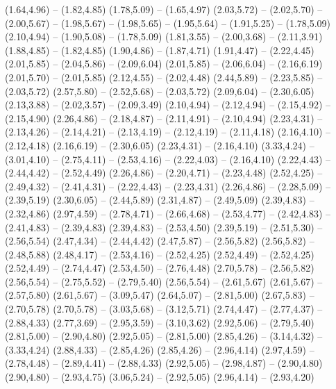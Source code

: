\providecommand\Strasse[1]{\csname geo:Strasse:#1\endcsname}
\def\StrasseListe{haupt,neben}
\expandafter\def\csname geo:Strasse:haupt\endcsname{
  (1.64,4.96) -- (1.82,4.85)
  (1.78,5.09) -- (1.65,4.97)
  (2.03,5.72) -- (2.02,5.70) -- (2.00,5.67) -- (1.98,5.67) -- (1.98,5.65) -- (1.95,5.64) -- (1.91,5.25) -- (1.78,5.09)
  (2.10,4.94) -- (1.90,5.08) -- (1.78,5.09)
  (1.81,3.55) -- (2.00,3.68) -- (2.11,3.91)
  (1.88,4.85) -- (1.82,4.85)
  (1.90,4.86) -- (1.87,4.71)
  (1.91,4.47) -- (2.22,4.45)
  (2.01,5.85) -- (2.04,5.86) -- (2.09,6.04)
  (2.01,5.85) -- (2.06,6.04) -- (2.16,6.19)
  (2.01,5.70) -- (2.01,5.85)
  (2.12,4.55) -- (2.02,4.48)
  (2.44,5.89) -- (2.23,5.85) -- (2.03,5.72)
  (2.57,5.80) -- (2.52,5.68) -- (2.03,5.72)
  (2.09,6.04) -- (2.30,6.05)
  (2.13,3.88) -- (2.02,3.57) -- (2.09,3.49)
  (2.10,4.94) -- (2.12,4.94) -- (2.15,4.92) -- (2.15,4.90)
  (2.26,4.86) -- (2.18,4.87) -- (2.11,4.91) -- (2.10,4.94)
  (2.23,4.31) -- (2.13,4.26) -- (2.14,4.21) -- (2.13,4.19) -- (2.12,4.19) -- (2.11,4.18)
  (2.16,4.10) -- (2.12,4.18)
  (2.16,6.19) -- (2.30,6.05)
  (2.23,4.31) -- (2.16,4.10)
  (3.33,4.24) -- (3.01,4.10) -- (2.75,4.11) -- (2.53,4.16) -- (2.22,4.03) -- (2.16,4.10)
  (2.22,4.43) -- (2.44,4.42) -- (2.52,4.49)
  (2.26,4.86) -- (2.20,4.71) -- (2.23,4.48)
  (2.52,4.25) -- (2.49,4.32) -- (2.41,4.31) -- (2.22,4.43) -- (2.23,4.31)
  (2.26,4.86) -- (2.28,5.09) -- (2.39,5.19)
  (2.30,6.05) -- (2.44,5.89)
  (2.31,4.87) -- (2.49,5.09)
  (2.39,4.83) -- (2.32,4.86)
  (2.97,4.59) -- (2.78,4.71) -- (2.66,4.68) -- (2.53,4.77) -- (2.42,4.83) -- (2.41,4.83) -- (2.39,4.83)
  (2.39,4.83) -- (2.53,4.50)
  (2.39,5.19) -- (2.51,5.30) -- (2.56,5.54)
  (2.47,4.34) -- (2.44,4.42)
  (2.47,5.87) -- (2.56,5.82)
  (2.56,5.82) -- (2.48,5.88)
  (2.48,4.17) -- (2.53,4.16) -- (2.52,4.25)
  (2.52,4.49) -- (2.52,4.25)
  (2.52,4.49) -- (2.74,4.47)
  (2.53,4.50) -- (2.76,4.48)
  (2.70,5.78) -- (2.56,5.82)
  (2.56,5.54) -- (2.75,5.52) -- (2.79,5.40)
  (2.56,5.54) -- (2.61,5.67)
  (2.61,5.67) -- (2.57,5.80)
  (2.61,5.67) -- (3.09,5.47)
  (2.64,5.07) -- (2.81,5.00)
  (2.67,5.83) -- (2.70,5.78)
  (2.70,5.78) -- (3.03,5.68) -- (3.12,5.71)
  (2.74,4.47) -- (2.77,4.37) -- (2.88,4.33)
  (2.77,3.69) -- (2.95,3.59) -- (3.10,3.62)
  (2.92,5.06) -- (2.79,5.40)
  (2.81,5.00) -- (2.90,4.80)
  (2.92,5.05) -- (2.81,5.00)
  (2.85,4.26) -- (3.14,4.32) -- (3.33,4.24)
  (2.88,4.33) -- (2.85,4.26)
  (2.85,4.26) -- (2.96,4.14)
  (2.97,4.59) -- (2.78,4.48) -- (2.89,4.41) -- (2.88,4.33)
  (2.92,5.05) -- (2.98,4.87) -- (2.90,4.80)
  (2.90,4.80) -- (2.93,4.75)
  (3.06,5.24) -- (2.92,5.05)
  (2.96,4.14) -- (2.93,4.20)
}
